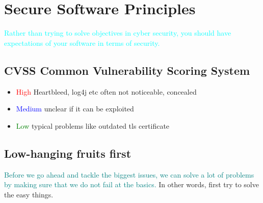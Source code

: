 \documentclass[main.tex,fontsize=8pt,paper=a4,paper=portrait,DIV=calc,]{scrartcl}
\begin{document}
\tableofcontents

\newcommand{\TITLE}{Secure Software}
\newcommand{\AUTHOR}{Fabio Lenherr}
\setcounter{tocdepth}{1}

\section{Secure Software Principles}
\textcolor{Cyan}{Rather than trying to solve objectives in cyber security, you should have expectations of your software in terms of security.}

\subsection{CVSS Common Vulnerability Scoring System}
\begin{itemize}
  \item \textcolor{red}{High}\newline
    Heartbleed, log4j etc\newline
    often not noticeable, concealed
  \item \textcolor{blue}{Medium}\newline
    unclear if it can be exploited
  \item \textcolor{green}{Low}\newline
    typical problems like outdated tls certificate
\end{itemize}

\subsection{Low-hanging fruits first}
\textcolor{teal}{Before we go ahead and tackle the biggest issues, we can solve a lot of problems by making sure that we do not fail at the basics.}\newline
In other words, first try to solve the easy things.
\end{document}

